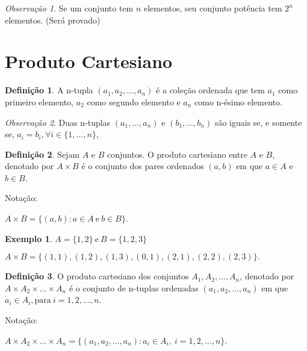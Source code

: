 \documentclass[]{book}
\theoremstyle{definition}
\newtheorem{definition}{Definição}[chapter]
\theoremstyle{definition}
\newtheorem{example}{Exemplo}[chapter]
\theoremstyle{definition}
\theoremstyle{remark}
\newtheorem*{remark}{Observação}
\begin{document}
\begin{remark}
\iffalse{} {Observação. } \fi{}Se um conjunto tem \(n\) elementos, seu conjunto potência tem \(2^n\) elementos. (Será provado)
\end{remark}

\hypertarget{produto-cartesiano}{%
\section{Produto Cartesiano}\label{produto-cartesiano}}

\begin{definition}
\protect\hypertarget{def:defprodcart}{}{\label{def:defprodcart} }A n-tupla \((a_1, a_2, \ldots, a_n)\) é a coleção ordenada que tem \(a_1\) como primeiro elemento, \(a_2\) como segundo elemento e \(a_n\) como n-ésimo elemento.
\end{definition}
\begin{remark}
\iffalse{} {Observação. } \fi{}Duas n-tuplas \((a_1, \ldots, a_n)\) e \((b_1, \ldots, b_n)\) são iguais se, e somente se, \(a_i = b_i, \forall i \in \{1, \ldots, n\}\),
\end{remark}
\begin{definition}
\protect\hypertarget{def:defprodcart2}{}{\label{def:defprodcart2} }Sejam \(A\) e \(B\) conjuntos. O produto cartesiano entre \(A\) e \(B\), denotado por \(A \times B\) é o conjunto dos pares ordenados \((a,b)\) em que \(a \in A\) e \(b \in B\).
\end{definition}

Notação:

\(A \times B = \{(a,b): a \in A \ \mbox{e} \ b \in B\}\).
\begin{example}
\protect\hypertarget{exm:unnamed-chunk-13}{}{\label{exm:unnamed-chunk-13} }
\(A = \{1,2\} \ \text{e} \ B = \{1,2,3\}\)

\(A \times B = \{(1,1), (1,2), (1,3), (0,1), (2,1), (2,2), (2,3)\}.\)
\end{example}
\begin{definition}
\protect\hypertarget{def:defprodcart3}{}{\label{def:defprodcart3} }O produto cartesiano dos conjuntos \(A_1, A_2, \ldots, A_n\), denotado por \(A \times A_2 \times \ldots \times A_n\) é o conjunto de n-tuplas ordenadas \((a_1, a_2, \ldots, a_n)\) em que \(a_i \in A_i, \text{para} \ i=1,2,\ldots,n\).
\end{definition}

Notação:

\(A \times A_2 \times \ldots \times A_n = \{(a_1, a_2, \ldots, a_n): a_i \in A_i, \ i=1,2,\ldots,n\}\).
\end{document}
